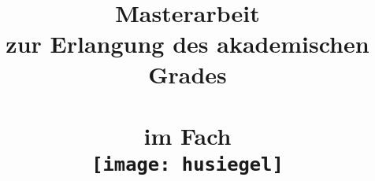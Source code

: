 

\author{}
\title{ \vspace{-3cm}\dctitle \\ 
\vspace{0.5cm}
\large{\dcsubtitle} \\ 
\vspace{0.5cm} {\Large \textbf{Masterarbeit}}\\ 
\vspace{0.5cm} \large{zur Erlangung des akademischen Grades \\ 
\dcdegree\\ im Fach \dcsubject \\\vspace{0.5cm}
\texttt{[image: husiegel]}\\ 
\vspace{0.5cm}  
\dcuniversity \\
\dcfaculty \\ 
\dcinstitute\\}}
%
%
